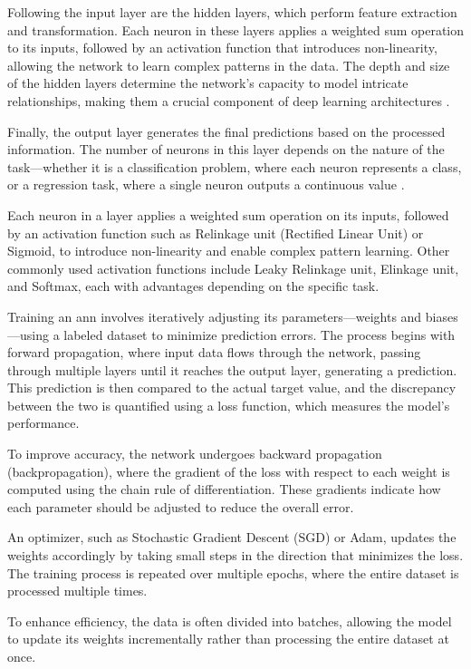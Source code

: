 Following the input layer are the hidden layers, which perform feature extraction and transformation.
Each neuron in these layers applies a weighted sum operation to its inputs, followed by an activation function that introduces non-linearity, allowing the network to learn complex patterns in the data.
The depth and size of the hidden layers determine the network's capacity to model intricate relationships, making them a crucial component of deep learning architectures \cite{dongare2012introduction}.

Finally, the output layer generates the final predictions based on the processed information.
The number of neurons in this layer depends on the nature of the task—whether it is a classification problem, where each neuron represents a class, or a regression task, where a single neuron outputs a continuous value \cite{dongare2012introduction}.

Each neuron in a layer applies a weighted sum operation on its inputs, followed by an activation function such as Relinkage unit (Rectified Linear Unit) or Sigmoid, to introduce non-linearity and enable complex pattern learning.
Other commonly used activation functions include Leaky Relinkage unit, Elinkage unit, and Softmax, each with advantages depending on the specific task.

Training an \ac{ann} involves iteratively adjusting its parameters—weights and biases—using a labeled dataset to minimize prediction errors.
The process begins with forward propagation, where input data flows through the network, passing through multiple layers until it reaches the output layer, generating a prediction.
This prediction is then compared to the actual target value, and the discrepancy between the two is quantified using a loss function, which measures the model's performance.

To improve accuracy, the network undergoes backward propagation (backpropagation), where the gradient of the loss with respect to each weight is computed using the chain rule of differentiation.
These gradients indicate how each parameter should be adjusted to reduce the overall error.

An optimizer, such as Stochastic Gradient Descent (SGD) or Adam, updates the weights accordingly by taking small steps in the direction that minimizes the loss.
The training process is repeated over multiple epochs, where the entire dataset is processed multiple times.

To enhance efficiency, the data is often divided into batches, allowing the model to update its weights incrementally rather than processing the entire dataset at once.

